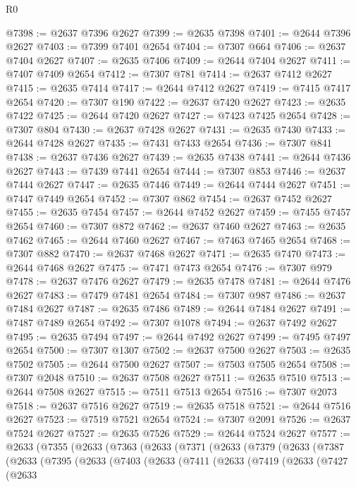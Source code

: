 \begin{lexlean}{R0}
\begin{coremodule}
@7398 := @2637 @7396 @2627
@7399 := @2635 @7398
@7401 := @2644 @7396 @2627
@7403 := @7399 @7401 @2654
@7404 := @7307 @664
@7406 := @2637 @7404 @2627
@7407 := @2635 @7406
@7409 := @2644 @7404 @2627
@7411 := @7407 @7409 @2654
@7412 := @7307 @781
@7414 := @2637 @7412 @2627
@7415 := @2635 @7414
@7417 := @2644 @7412 @2627
@7419 := @7415 @7417 @2654
@7420 := @7307 @190
@7422 := @2637 @7420 @2627
@7423 := @2635 @7422
@7425 := @2644 @7420 @2627
@7427 := @7423 @7425 @2654
@7428 := @7307 @804
@7430 := @2637 @7428 @2627
@7431 := @2635 @7430
@7433 := @2644 @7428 @2627
@7435 := @7431 @7433 @2654
@7436 := @7307 @841
@7438 := @2637 @7436 @2627
@7439 := @2635 @7438
@7441 := @2644 @7436 @2627
@7443 := @7439 @7441 @2654
@7444 := @7307 @853
@7446 := @2637 @7444 @2627
@7447 := @2635 @7446
@7449 := @2644 @7444 @2627
@7451 := @7447 @7449 @2654
@7452 := @7307 @862
@7454 := @2637 @7452 @2627
@7455 := @2635 @7454
@7457 := @2644 @7452 @2627
@7459 := @7455 @7457 @2654
@7460 := @7307 @872
@7462 := @2637 @7460 @2627
@7463 := @2635 @7462
@7465 := @2644 @7460 @2627
@7467 := @7463 @7465 @2654
@7468 := @7307 @882
@7470 := @2637 @7468 @2627
@7471 := @2635 @7470
@7473 := @2644 @7468 @2627
@7475 := @7471 @7473 @2654
@7476 := @7307 @979
@7478 := @2637 @7476 @2627
@7479 := @2635 @7478
@7481 := @2644 @7476 @2627
@7483 := @7479 @7481 @2654
@7484 := @7307 @987
@7486 := @2637 @7484 @2627
@7487 := @2635 @7486
@7489 := @2644 @7484 @2627
@7491 := @7487 @7489 @2654
@7492 := @7307 @1078
@7494 := @2637 @7492 @2627
@7495 := @2635 @7494
@7497 := @2644 @7492 @2627
@7499 := @7495 @7497 @2654
@7500 := @7307 @1307
@7502 := @2637 @7500 @2627
@7503 := @2635 @7502
@7505 := @2644 @7500 @2627
@7507 := @7503 @7505 @2654
@7508 := @7307 @2048
@7510 := @2637 @7508 @2627
@7511 := @2635 @7510
@7513 := @2644 @7508 @2627
@7515 := @7511 @7513 @2654
@7516 := @7307 @2073
@7518 := @2637 @7516 @2627
@7519 := @2635 @7518
@7521 := @2644 @7516 @2627
@7523 := @7519 @7521 @2654
@7524 := @7307 @2091
@7526 := @2637 @7524 @2627
@7527 := @2635 @7526
@7529 := @2644 @7524 @2627
@7577 := @2633
    (@7355
      (@2633
        (@7363
          (@2633
            (@7371
              (@2633
                (@7379
                  (@2633
                    (@7387
                      (@2633
                        (@7395
                          (@2633
                            (@7403
                              (@2633
                                (@7411
                                  (@2633
                                    (@7419
                                      (@2633
                                        (@7427
                                          (@2633

\end{coremodule}
\end{lexlean}
